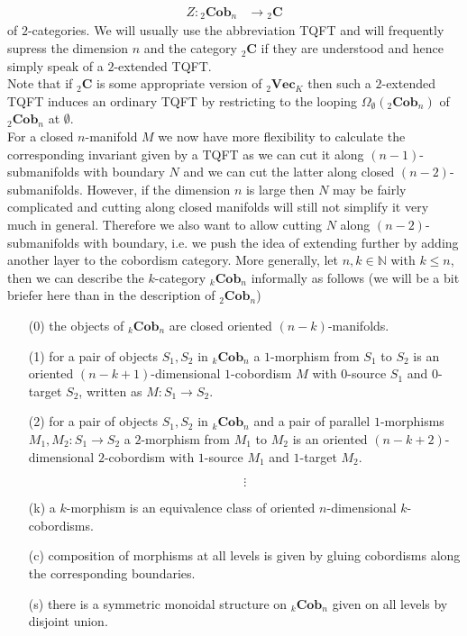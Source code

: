 \begin{align*}
  Z
  \colon
  {_{2}}\mathbf{Cob}_{n}
  &\to
  {_{2}}\mathbf{C}
\end{align*}
of $2$-categories. We will usually use the abbreviation TQFT and will frequently supress the dimension $n$ and the category ${_{2}}\mathbf{C}$ if they are understood and hence simply speak of a $2$-extended TQFT.
\\
Note that if ${_{2}}\mathbf{C}$ is some appropriate version of ${_{2}}\mathbf{Vec}_{K}$ then such a $2$-extended TQFT induces an ordinary TQFT by restricting to the looping $\Omega_{\emptyset}({_{2}}\mathbf{Cob}_{n})$ of ${_{2}}\mathbf{Cob}_{n}$ at $\emptyset$.
\\
For a closed $n$-manifold $M$ we now have more flexibility to calculate the corresponding invariant given by a TQFT as we can cut it along $(n-1)$-submanifolds with boundary $N$ and we can cut the latter along closed $(n-2)$-submanifolds. However, if the dimension $n$ is large then $N$ may be fairly complicated and cutting along closed manifolds will still not simplify it very much in general. Therefore we also want to allow cutting $N$ along $(n-2)$-submanifolds with boundary, i.e. we push the idea of extending further by adding another layer to the cobordism category. More generally, let $n,k \in \mathbb{N}$ with $k \leq n$, then we can describe the $k$-category ${_{k}}\mathbf{Cob}_{n}$ informally as follows (we will be a bit briefer here than in the description of ${_{2}}\mathbf{Cob}_{n}$)
\begin{enumerate}
\item[(0)]
the objects of ${_{k}}\mathbf{Cob}_{n}$ are closed oriented $(n-k)$-manifolds.

\item[(1)]
for a pair of objects $S_{1},S_{2}$ in ${_{k}}\mathbf{Cob}_{n}$ a $1$-morphism from $S_{1}$ to $S_{2}$ is an oriented $(n-k+1)$-dimensional $1$-cobordism $M$ with $0$-source $S_{1}$ and $0$-target $S_{2}$, written as $M \colon S_{1} \to S_{2}$.

\item[(2)]
for a pair of objects $S_{1},S_{2}$ in ${_{k}}\mathbf{Cob}_{n}$ and a pair of parallel $1$-morphisms $M_{1},M_{2} \colon S_{1} \to S_{2}$ a $2$-morphism from $M_{1}$ to $M_{2}$ is an oriented $(n-k+2)$-dimensional $2$-cobordism with $1$-source $M_{1}$ and $1$-target $M_{2}$.

\item[]
\begin{equation*}
\vdots
\end{equation*}
\item[]

\item[(k)]
a $k$-morphism is an equivalence class of oriented $n$-dimensional $k$-cobordisms.

\item[(c)]
composition of morphisms at all levels is given by gluing cobordisms along the corresponding boundaries.

\item[(s)]
there is a symmetric monoidal structure on ${_{k}}\mathbf{Cob}_{n}$ given on all levels by disjoint union.
\end{enumerate}
